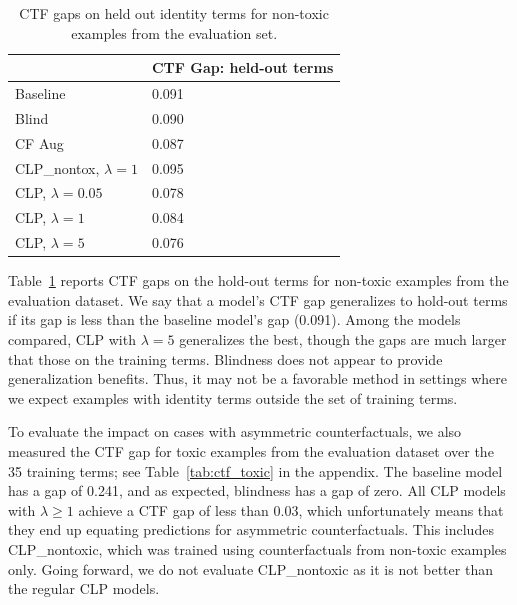 \documentclass[letterpaper]{article} %
\theoremstyle{definition}
\begin{document}
\begin{table}[]
\centering
\begin{tabular}{l|l|}
\cline{2-2}
                                               &  CTF Gap: held-out terms \\ \hline
\multicolumn{1}{|l|}{Baseline}                 & 0.091       \\ \hline
\multicolumn{1}{|l|}{Blind}                    & 0.090       \\ \hline
\multicolumn{1}{|l|}{CF Aug}                   & 0.087       \\ \hline
\multicolumn{1}{|l|}{CLP\_nontox, $\lambda=1$} & 0.095       \\ \hline
\multicolumn{1}{|l|}{CLP,  $\lambda=0.05$}     & 0.078       \\ \hline
\multicolumn{1}{|l|}{CLP,  $\lambda=1$}        & 0.084       \\ \hline
\multicolumn{1}{|l|}{CLP,  $\lambda=5$}        & 0.076       \\ \hline
\end{tabular}
\caption{CTF gaps on held out identity terms for non-toxic examples from the evaluation set.}\label{tab:ctf_generalization}
\end{table}


Table~\ref{tab:ctf_generalization} reports CTF gaps on the hold-out terms for non-toxic examples from the evaluation dataset.  We say that a model's CTF gap generalizes to hold-out terms if its gap is less than the baseline model's gap (0.091). Among the models compared, CLP with $\lambda=5$ generalizes the best, though the gaps are much larger that those on the training terms. Blindness does not appear to provide generalization benefits. Thus, it may not be a favorable method in settings where we expect examples with identity terms outside the set of training terms.

To evaluate the impact on cases with asymmetric counterfactuals, we also measured the CTF gap for toxic examples from the evaluation dataset over the 35 training terms; see Table~\ref{tab:ctf_toxic} in the appendix. The baseline model has a gap of 0.241, and as expected, blindness has a gap of zero. All CLP models with $\lambda \geq 1$ achieve a CTF gap of less than 0.03, which unfortunately means that they end up equating predictions for asymmetric counterfactuals. This includes CLP\_nontoxic, which was trained using counterfactuals from non-toxic examples only. Going forward, we do not evaluate CLP\_nontoxic as it is not better than the regular CLP models.
\end{document}
